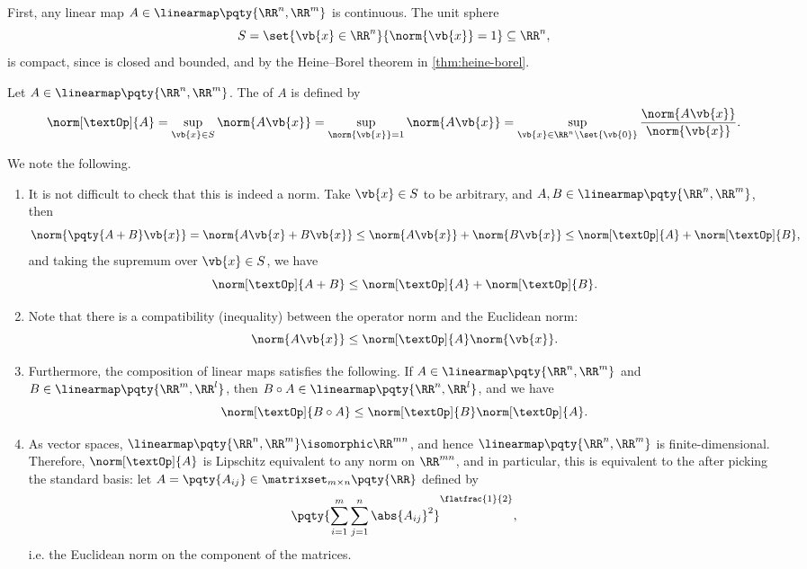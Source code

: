 First, any linear map \(A \in \linearmap\pqty{\RR^n, \RR^m}\) is continuous. The unit sphere
\[
    S = \set{\vb{x} \in \RR^n}{\norm{\vb{x}} = 1} \subseteq \RR^n,
\]
is compact, since is closed and bounded, and by the Heine--Borel theorem in \autoref{thm:heine-borel}.

\begin{definition}
    Let \(A \in \linearmap\pqty{\RR^n, \RR^m}\). The  of \(A\) is defined by
    \[
        \norm[\textOp]{A} = \sup_{\vb{x} \in S} \norm{A\vb{x}} = \sup_{\norm{\vb{x}} = 1} \norm{A \vb{x}} = \sup_{\vb{x} \in \RR^n \setminus \set{\vb{0}}} \frac{\norm{A \vb{x}}}{\norm{\vb{x}}}.
    \]
\end{definition}

We note the following.

\begin{enumerate}
    \item It is not difficult to check that this is indeed a norm. Take \(\vb{x} \in S\) to be arbitrary, and \(A, B \in \linearmap\pqty{\RR^n, \RR^m}\), then
    \[
        \norm{\pqty{A + B} \vb{x}} = \norm{A\vb{x} + B\vb{x}} \leq \norm{A\vb{x}} + \norm{B\vb{x}} \leq \norm[\textOp]{A} + \norm[\textOp]{B},
    \]
    and taking the supremum over \(\vb{x} \in S\), we have
    \[
        \norm[\textOp]{A + B} \leq \norm[\textOp]{A} + \norm[\textOp]{B}.
    \]
    
    \item Note that there is a compatibility (inequality) between the operator norm and the Euclidean norm:
    \[
        \norm{A\vb{x}} \leq \norm[\textOp]{A} \norm{\vb{x}}.
    \]
    
    \item Furthermore, the composition of linear maps satisfies the following. If \(A \in \linearmap\pqty{\RR^n, \RR^m}\) and \(B \in \linearmap\pqty{\RR^m, \RR^l}\), then \(B \circ A \in \linearmap\pqty{\RR^n, \RR^l}\), and we have
    \[
        \norm[\textOp]{B \circ A} \leq \norm[\textOp]{B} \norm[\textOp]{A}.
    \]

    \item As vector spaces, \(\linearmap\pqty{\RR^n, \RR^m} \isomorphic \RR^{mn}\), and hence \(\linearmap\pqty{\RR^n, \RR^m}\) is finite-dimensional. Therefore, \(\norm[\textOp]{A}\) is Lipschitz equivalent to any norm on \(\RR^{mn}\), and in particular, this is equivalent to the  after picking the standard basis: let \(A = \pqty{A_{ij}} \in \matrixset_{m \times n}\pqty{\RR}\) defined by   
    \[
        \pqty{\sum_{i = 1}^{m} \sum_{j = 1}^{n} \abs{A_{ij}}^2}^{\flatfrac{1}{2}},
    \]
    i.e. the Euclidean norm on the component of the matrices.
\end{enumerate}

